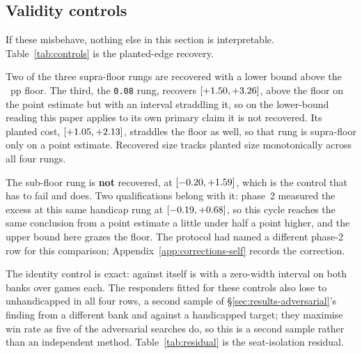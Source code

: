 \subsection{Validity controls}
\label{sec:results-controls}

If these misbehave, nothing else in this section is interpretable. Table~\ref{tab:controls} is the
planted-edge recovery.

\begin{table}[!ht]\centering
\caption{Planted-edge recovery. The recovered excess is the responder's edge against the handicapped
target minus its edge against the unhandicapped one. The sub-floor rung must \emph{not} be recovered.}
\label{tab:controls}
{\tabfont}
\end{table}

Two of the three supra-floor rungs are recovered with a lower bound above the
\vsevenPrimaryFloor{}~pp floor. The third, the \texttt{0.08} rung, recovers
\vsevenBnineHeightExcess{} $[+1.50, +3.26]$, above the floor
on the point estimate but with an interval straddling it, so on the lower-bound reading this paper
applies to its own primary claim it is not recovered. Its planted cost,
\vsevenBnineHeightCost{} $[+1.05, +2.13]$, straddles the floor
as well, so that rung is supra-floor only on a point estimate. Recovered size tracks planted size
monotonically across all four rungs.

The sub-floor rung is \textbf{not} recovered, at \vsevenBnineHfiveExcess{}
$[-0.20, +1.59]$, which is the control that has to fail and
does. Two qualifications belong with it: phase~2 measured the excess at this same handicap rung at
\vsevenSubFloorExcess{} $[-0.19, +0.68]$, so this cycle reaches
the same conclusion from a point estimate a little under half a point higher, and the upper bound
here grazes the floor. The protocol had named a different phase-2 row for this comparison;
Appendix~\ref{app:corrections-self} records the correction.

The identity control is exact: \sestina{} against itself is \vsevenIdentityRate{} with a
zero-width interval on both banks over \vsevenIdentityN{} games each. The responders fitted for these
controls also lose to unhandicapped \sestina{} in all four rows, a second sample of
\S\ref{sec:results-adversarial}'s finding from a different bank and against a handicapped target;
they maximise win rate as five of the \vsevenBfourArmsWord{} adversarial searches do, so this is a second sample
rather than an independent method. Table~\ref{tab:residual} is the seat-isolation residual.

